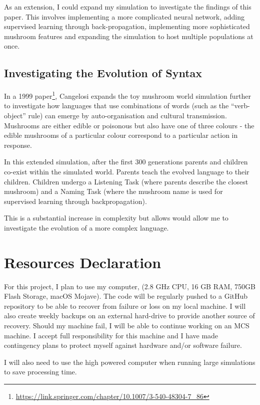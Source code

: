 \documentclass[12pt]{article}
\begin{document}
As an extension, I could expand my simulation to investigate the findings of this paper. This involves implementing a more complicated neural network, adding supervised learning through back-propagation, implementing more sophisticated mushroom features and expanding the simulation to host multiple populations at once.

\subsection*{Investigating the Evolution of Syntax}

In a 1999 paper\footnote{\url{https://link.springer.com/chapter/10.1007/3-540-48304-7_86}}, Cangelosi expands the toy mushroom world simulation further to investigate how languages that use combinations of words (such as the ``verb-object'' rule) can emerge by auto-organisation and cultural transmission. Mushrooms are either edible or poisonous but also have one of three colours - the edible mushrooms of a particular colour correspond to a particular action in response.

In this extended simulation, after the first 300 generations parents and children co-exist within the simulated world. Parents teach the evolved language to their children. Children undergo a Listening Task (where parents describe the closest mushroom) and a Naming Task (where the mushroom name is used for supervised learning through backpropagation).

This is a substantial increase in complexity but allows would allow me to investigate the evolution of a more complex language.

 \section*{Resources Declaration}

For this project, I plan to use my computer, (2.8 GHz CPU, 16 GB RAM, 750GB Flash Storage,
macOS Mojave). The code will be regularly pushed to a GitHub repository to be able to recover from failure or loss on my local machine. I will also create weekly backups on an external hard-drive to provide another source of recovery. Should my machine fail, I will be able to continue working on an MCS machine. I accept full responsibility for this machine and I have made contingency plans to protect myself against hardware and/or software failure. 

I will also need to use the high powered computer when running large simulations to save processing time.

 
\end{document}
